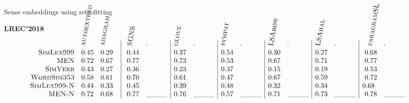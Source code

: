 \documentclass[usenames,dvipsnames]{beamer}
\begin{document}
\begin{frame}{Sense embeddings using retrofitting}

\textbf{LREC'2018}~\cite{remus:2018}
\vspace{1.5em}
\begin{table}
    \tiny
 	
 	\def\arraystretch{1.2}%
 	\setlength{\arraycolsep}{3pt}
 	
 	$$
 	\begin{array}{rll|ll|ll|ll|ll|ll|ll}
 	  & \rotatebox{80}{\textsc{autoextend}\hspace{-10em}} 
 	  & \rotatebox{80}{\textsc{adagram}\hspace{-10em}} 
 	  & ~\rotatebox{80}{\textsc{SGNS}\hspace{-10em}} 
 	  & \rotatebox{80}{\textsc{.}\hspace{-10em}} 
 	  & \rotatebox{80}{\textsc{glove}\hspace{-10em}} 
 	  & \rotatebox{80}{\textsc{.}\hspace{-10em}} 
 	  & \rotatebox{80}{\textsc{sympat}\hspace{-10em}} 
 	  & \rotatebox{80}{\textsc{.}\hspace{-10em}} 
 	  & \rotatebox{80}{\textsc{LSAbow}\hspace{-10em}} 
 	  & \rotatebox{80}{\textsc{.}\hspace{-10em}}
 	  & \rotatebox{80}{\textsc{LSAhal}\hspace{-10em}}
	  & \rotatebox{80}{\textsc{.}\hspace{-10em}}
	  & ~~\rotatebox{80}{\textsc{paragramSL}\hspace{-10em}} 
 	  & \rotatebox{80}{\textsc{.}\hspace{-10em}}  
 	  \\
   	 \textsc{SimLex999}  & 0.45 & 0.29 ~~&~ 0.44 &  & 0.37 &  & 0.54 &  & 0.30 &  & 0.27 & & ~ {0.68} &  \\
   	 \textsc{MEN} & 0.72 & 0.67 &~   0.77 &  & 0.73 &  & 0.53 &  & 0.67 &  & 0.71 &  &~ 0.77 &  \\
   	 \textsc{SimVerb} & 0.43 & 0.27 &~   0.36 &  & 0.23 &  & 0.37 &  & 0.15 &  & 0.19 &  &~ 0.53 &  \\
   	 \textsc{WordSim353} & 0.58 & 0.61 &~   {0.70} &  & 0.61 &  & 0.47 & & {0.67} &  & 0.59 & &~ 0.72 & \\ 

   	 \textsc{SimLex999-N}  & 0.44 & 0.33 ~~&~ 0.45 &  & 0.39 &  & 0.48 &  & 0.32 & & 0.34 & & {0.68} & \\
   	 \textsc{MEN-N} 		 & 0.72 & 0.68 &~   0.77 & \_\_\_\_ & 0.76 & \_\_\_\_ & 0.57 & \_\_\_\_ & 0.71 & \_\_\_\_ & 0.73 & \_\_\_\_ &~ 0.78 & \_\_\_\_ \\
 	\end{array}
 	$$
 
 \end{table}


\end{frame}
\end{document}
